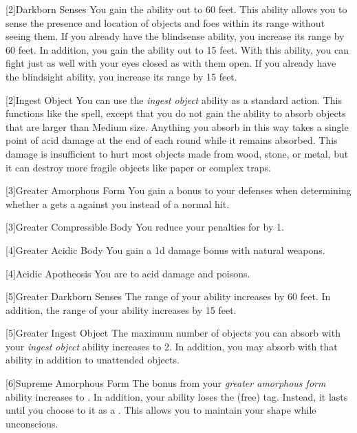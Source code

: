             [2]{Darkborn Senses} You gain the  ability out to 60 feet.
            This ability allows you to sense the presence and location of objects and foes within its range without seeing them.
            If you already have the blindsense ability, you increase its range by 60 feet.
            In addition, you gain the  ability out to 15 feet.
            With this ability, you can fight just as well with your eyes closed as with them open.
            If you already have the blindsight ability, you increase its range by 15 feet.

            [2]{Ingest Object} You can use the \textit{ingest object} ability as a standard action.
            This functions like the  spell, except that you do not gain the ability to absorb objects that are larger than Medium size.
            Anything you absorb in this way takes a single point of acid damage at the end of each round while it remains absorbed.
            This damage is insufficient to hurt most objects made from wood, stone, or metal, but it can destroy more fragile objects like paper or complex traps.

            [3]{Greater Amorphous Form} You gain a  bonus to your defenses when determining whether a  gets a  against you instead of a normal hit.

            [3]{Greater Compressible Body} You reduce your penalties for \squeezing by 1.

            [4]{Greater Acidic Body} You gain a \plus1d damage bonus with natural weapons.

            [4]{Acidic Apotheosis} You are  to acid damage and poisons.

            [5]{Greater Darkborn Senses} The range of your  ability increases by 60 feet.
            In addition, the range of your  ability increases by 15 feet.

            [5]{Greater Ingest Object} The maximum number of objects you can absorb with your \textit{ingest object} ability increases to 2.
            In addition, you may absorb  with that ability in addition to unattended objects.

            [6]{Supreme Amorphous Form} The bonus from your \textit{greater amorphous form} ability increases to .
            In addition, your  ability loses the  (free) tag.
            Instead, it lasts until you choose to  it as a .
            This allows you to maintain your shape while unconscious.

